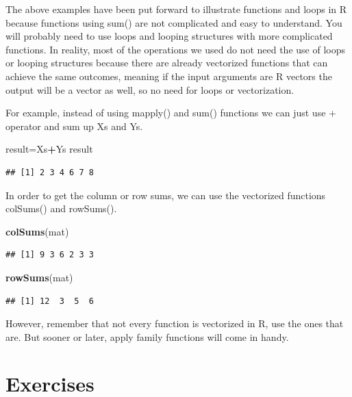 \documentclass[12pt,]{krantz}
\newenvironment{Shaded}{\begin{snugshade}}{\end{snugshade}}
\newcommand{\KeywordTok}[1]{\textcolor[rgb]{0.13,0.29,0.53}{\textbf{#1}}}
\newcommand{\NormalTok}[1]{#1}
\newcommand{\OperatorTok}[1]{\textcolor[rgb]{0.81,0.36,0.00}{\textbf{#1}}}
\theoremstyle{definition}
\theoremstyle{definition}
\theoremstyle{definition}
\theoremstyle{remark}
\begin{document}
The above examples have been put forward to illustrate functions and
loops in R because functions using sum() are not complicated and easy to
understand. You will probably need to use loops and looping structures
with more complicated functions. In reality, most of the operations we
used do not need the use of loops or looping structures because there
are already vectorized functions that can achieve the same outcomes,
meaning if the input arguments are R vectors the output will be a vector
as well, so no need for loops or vectorization.

For example, instead of using mapply() and sum() functions we can just
use + operator and sum up Xs and Ys.

\begin{Shaded}
\begin{Highlighting}[]
\NormalTok{result=Xs}\OperatorTok{+}\NormalTok{Ys}
\NormalTok{result}
\end{Highlighting}
\end{Shaded}

\begin{verbatim}
## [1] 2 3 4 6 7 8
\end{verbatim}

In order to get the column or row sums, we can use the vectorized
functions colSums() and rowSums().

\begin{Shaded}
\begin{Highlighting}[]
\KeywordTok{colSums}\NormalTok{(mat)}
\end{Highlighting}
\end{Shaded}

\begin{verbatim}
## [1] 9 3 6 2 3 3
\end{verbatim}

\begin{Shaded}
\begin{Highlighting}[]
\KeywordTok{rowSums}\NormalTok{(mat)}
\end{Highlighting}
\end{Shaded}

\begin{verbatim}
## [1] 12  3  5  6
\end{verbatim}

However, remember that not every function is vectorized in R, use the
ones that are. But sooner or later, apply family functions will come in
handy.

\hypertarget{exercises}{%
\section{Exercises}\label{exercises}}
\end{document}
